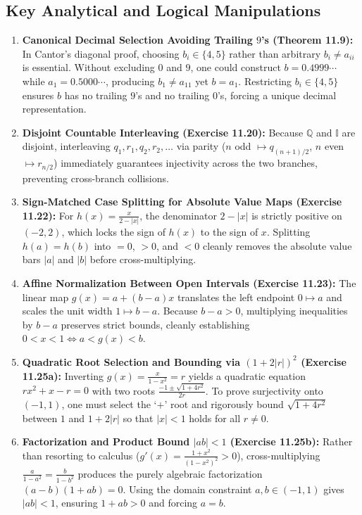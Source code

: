 \documentclass[11pt, letterpaper]{article}
\theoremstyle{definition}
\theoremstyle{remark}
\begin{document}
\subsection{Key Analytical and Logical Manipulations}

\begin{enumerate}[label=\textbf{\arabic*.}]
    \item \textbf{Canonical Decimal Selection Avoiding Trailing $9$'s (Theorem 11.9):}
    In Cantor's diagonal proof, choosing $b_i \in \{4, 5\}$ rather than arbitrary $b_i \neq a_{ii}$ is essential. Without excluding $0$ and $9$, one could construct $b = 0.4999\cdots$ while $a_1 = 0.5000\cdots$, producing $b_1 \neq a_{11}$ yet $b = a_1$. Restricting $b_i \in \{4, 5\}$ ensures $b$ has no trailing $9$'s and no trailing $0$'s, forcing a unique decimal representation.

    \item \textbf{Disjoint Countable Interleaving (Exercise 11.20):}
    Because $\mathbb{Q}$ and $\mathbb{I}$ are disjoint, interleaving $q_1, r_1, q_2, r_2, \dots$ via parity ($n$ odd $\mapsto q_{(n+1)/2}$, $n$ even $\mapsto r_{n/2}$) immediately guarantees injectivity across the two branches, preventing cross-branch collisions.

    \item \textbf{Sign-Matched Case Splitting for Absolute Value Maps (Exercise 11.22):}
    For $h(x) = \frac{x}{2 - |x|}$, the denominator $2 - |x|$ is strictly positive on $(-2, 2)$, which locks the sign of $h(x)$ to the sign of $x$. Splitting $h(a) = h(b)$ into $= 0$, $> 0$, and $< 0$ cleanly removes the absolute value bars $|a|$ and $|b|$ before cross-multiplying.

    \item \textbf{Affine Normalization Between Open Intervals (Exercise 11.23):}
    The linear map $g(x) = a + (b - a)x$ translates the left endpoint $0 \mapsto a$ and scales the unit width $1 \mapsto b - a$. Because $b - a > 0$, multiplying inequalities by $b - a$ preserves strict bounds, cleanly establishing $0 < x < 1 \iff a < g(x) < b$.

    \item \textbf{Quadratic Root Selection and Bounding via $(1 + 2|r|)^2$ (Exercise 11.25a):}
    Inverting $g(x) = \frac{x}{1 - x^2} = r$ yields a quadratic equation $rx^2 + x - r = 0$ with two roots $\frac{-1 \pm \sqrt{1 + 4r^2}}{2r}$. To prove surjectivity onto $(-1, 1)$, one must select the `$+$' root and rigorously bound $\sqrt{1 + 4r^2}$ between $1$ and $1 + 2|r|$ so that $|x| < 1$ holds for all $r \neq 0$.

    \item \textbf{Factorization and Product Bound $|ab| < 1$ (Exercise 11.25b):}
    Rather than resorting to calculus ($g'(x) = \frac{1 + x^2}{(1 - x^2)^2} > 0$), cross-multiplying $\frac{a}{1 - a^2} = \frac{b}{1 - b^2}$ produces the purely algebraic factorization $(a - b)(1 + ab) = 0$. Using the domain constraint $a, b \in (-1, 1)$ gives $|ab| < 1$, ensuring $1 + ab > 0$ and forcing $a = b$.
\end{enumerate}
\end{document}
